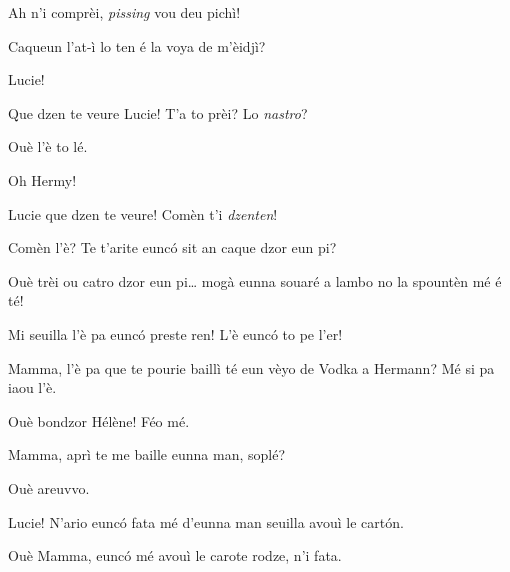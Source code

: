 \begin{drama}
\Cesarspeaks  Ah n'i comprèi, \textit{pissing} vou deu pichì!



\Luciespeaks  Caqueun l’at-ì lo ten é la voya de m’èidjì? 

\Hermannspeaks Lucie!


\Cesarspeaks Que dzen te veure Lucie! T'a to prèi? Lo \textit{nastro}?

\Luciespeaks Ouè l'è to lé.


\Luciespeaks{} Oh Hermy!

\Hermannspeaks Lucie que dzen te veure! Comèn t'i \textit{dzenten}!


\Luciespeaks Comèn l'è? Te t'arite eunc\'o sit an caque dzor eun pi? 

\Hermannspeaks Ouè trèi ou catro dzor eun pi\ldots {} mogà eunna souaré a lambo no la spountèn mé é té!


\Luciespeaks Mi seuilla l'è pa eunc\'o preste ren!  L'è eunc\'o to pe l'er!

\Helenespeaks{}  Mamma, l'è pa que te pourie baillì té eun vèyo de Vodka a Hermann? Mé si pa iaou l'è.

\Luciespeaks Ouè bondzor Hélène! Féo mé. 


\Remyspeaks  {} Mamma, aprì te me baille eunna man, soplé?

\Luciespeaks Ouè areuvvo.

\Cesarspeaks Lucie! N'ario eunc\'o fata mé d'eunna man seuilla avouì le cart\'on.

\Helenespeaks  Ouè Mamma, eunc\'o mé avouì le carote rodze, n'i fata.


\end{drama}
